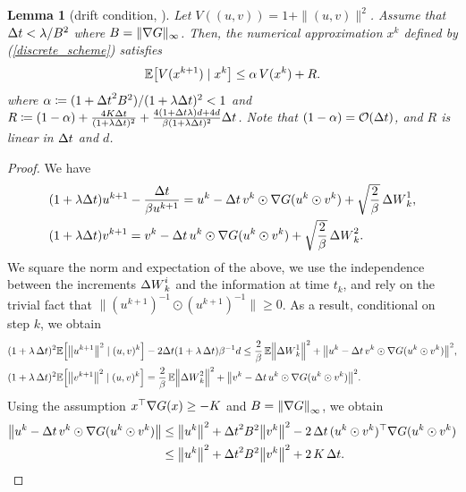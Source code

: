 \documentclass[11pt, twoside]{report}
\newtheorem{lemma}[theorem]{Lemma}
\begin{document}
\begin{lemma}[drift condition, \texorpdfstring{\cite[Lemma~4.1]{2025hadalangsamp}}{}]\label{lem:2ndmoments_discrete}
Let $V((u,v))=1+\|(u,v)\|^2$.
Assume that ${\Delta t}  < \lambda/B^2$ where $B=\|\nabla G\|_\infty$. Then, the numerical approximation $x^k$ defined by (\ref{discrete_scheme}) satisfies
    $$
   \EE \bp{ V(x^{k+1})  \mid x^k}\leq \alpha\,  V(x^k)  +R .
    $$
    where $\alpha \coloneq (1+{\Delta t}^2 B^2)/ (1+\lambda {\Delta t})^2  <1$ and
    $R\coloneq (1-\alpha) +  \frac{4K {\Delta t}}{(1+\lambda {\Delta t})^2  } + \frac{4(1+{\Delta t} \lambda)d + 4d}{\beta (1+\lambda {\Delta t})^2  }{\Delta t}$. Note that $(1-\alpha) = \mathcal{O}({\Delta t})$, and $R$ is linear in ${\Delta t}$ and $d$.
\end{lemma}
\begin{proof} We have
    \begin{align}
        &(1+ \lambda {\Delta t}) u^{k+1} - \frac{{\Delta t}}{\beta u^{k+1}} = u^k - {\Delta t} \,v^k \odot \nabla G(u^k\odot v^k) + \sqrt{\frac{2}{\beta}} \,{\Delta W}^1_k,\\
         &(1+ \lambda {\Delta t}) v^{k+1} = v^k - {\Delta t}\, u^k \odot \nabla G(u^k \odot v^k) + \sqrt{\frac{2}{\beta}} \,{\Delta W}^2_k.
    \end{align}
    We square the norm and expectation of the above, we use the independence between the increments ${\Delta W}^i_k$ and the information at time $t_k$, and rely on the trivial fact that $\|(u^{k+1})^{-1} \odot (u^{k+1})^{-1}\| \geq 0$. 
    As a result, conditional on step $k$, we obtain 
    \begin{align*}
        &(1+ \lambda \,\deltat)^2 \EE \bp{\norm{u^{k+1}}^2\mid (u,v)^k} - 2\deltat (1+\lambda\, \deltat)\beta^{-1} d  \leq 
        {\frac{2}{\beta}}\, \EE \norm{\deltaw^1_k}^2 
          + \norm{u^k - \deltat \,v^k \odot \nabla G(u^k \odot v^k) }^2, \\
         &(1+ \lambda \,\deltat)^2 \EE\bp{\norm{v^{k+1}}^2\mid (u,v)^k}  = \frac{2}{\beta} \,\EE\norm{ \deltaw^2_k}^2  + \norm{v^k - \deltat\, u^k \odot \nabla G(u^k\odot v^k)}^2.
    \end{align*}
Using the assumption $x^\top \nabla G(x) \geq -K$ and $B=\left\lVert\nabla G\right\rVert_\infty$, we obtain 
    \begin{align*}
        \norm{u^k-\deltat \,v^k \odot \nabla G(u^k\odot  v^k)} &\leq \norm{u^k}^2  + \deltat^2 \cinfty^2 \norm{v^k}^2 - 2 \,\Delta t\,(u^k \odot v^k)^\top \nabla G(u^k \odot v^k)\\
        &\leq \norm{u^k}^2  + \deltat^2 \cinfty^2 \norm{v^k}^2 +2\,\ccc\,\deltat.

\end{align*}
\end{proof}
\end{document}
